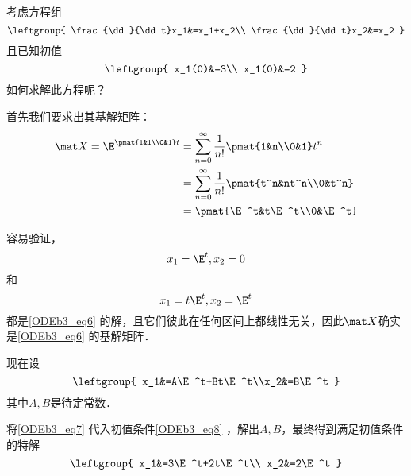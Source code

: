 \begin{example}{}
考虑方程组
\begin{equation}\label{ODEb3_eq6}
\leftgroup{
    \frac{\dd}{\dd t}x_1&=x_1+x_2\\
    \frac{\dd}{\dd t}x_2&=x_2
}
\end{equation}
且已知初值
\begin{equation}\label{ODEb3_eq8}
\leftgroup{
    x_1(0)&=3\\
    x_1(0)&=2
}
\end{equation}
如何求解此方程呢？

首先我们要求出其基解矩阵：
\begin{equation}
\begin{aligned}
\mat X=\E^{\pmat{1&1\\0&1}t}&=\sum_{n=0}^\infty\frac{1}{n!}\pmat{1&n\\0&1}t^n\\
&=\sum_{n=0}^\infty\frac{1}{n!}\pmat{t^n&nt^n\\0&t^n}\\
&=\pmat{\E^t&t\E^t\\0&\E^t}
\end{aligned}
\end{equation}

容易验证，
\begin{equation}
x_1=\E^t, x_2=0
\end{equation}
和
\begin{equation}
x_1=t\E^t, x_2=\E^t
\end{equation}
都是\autoref{ODEb3_eq6} 的解，且它们彼此在任何区间上都线性无关，因此$\mat X$确实是\autoref{ODEb3_eq6} 的基解矩阵．

现在设
\begin{equation}\label{ODEb3_eq7}
\leftgroup{
x_1&=A\E^t+Bt\E^t\\x_2&=B\E^t
}
\end{equation}
其中$A, B$是待定常数．

将\autoref{ODEb3_eq7} 代入初值条件\autoref{ODEb3_eq8} ，解出$A, B$，最终得到满足初值条件的特解
\begin{equation}
\leftgroup{
    x_1&=3\E^t+2t\E^t\\
    x_2&=2\E^t
}
\end{equation}


\end{example}




















